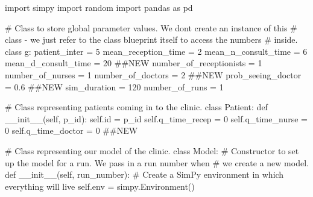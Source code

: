 \documentclass[
  letterpaper,
  DIV=11,
  numbers=noendperiod]{scrreprt}
\newenvironment{Shaded}{}{}
\newcommand{\BuiltInTok}[1]{\textcolor[rgb]{0.84,0.23,0.29}{#1}}
\newcommand{\CommentTok}[1]{\textcolor[rgb]{0.42,0.45,0.49}{#1}}
\newcommand{\DecValTok}[1]{\textcolor[rgb]{0.00,0.36,0.77}{#1}}
\newcommand{\FloatTok}[1]{\textcolor[rgb]{0.00,0.36,0.77}{#1}}
\newcommand{\FunctionTok}[1]{\textcolor[rgb]{0.44,0.26,0.76}{#1}}
\newcommand{\ImportTok}[1]{\textcolor[rgb]{0.01,0.18,0.38}{#1}}
\newcommand{\KeywordTok}[1]{\textcolor[rgb]{0.84,0.23,0.29}{#1}}
\newcommand{\NormalTok}[1]{\textcolor[rgb]{0.14,0.16,0.18}{#1}}
\newcommand{\OperatorTok}[1]{\textcolor[rgb]{0.14,0.16,0.18}{#1}}
\newcommand{\VariableTok}[1]{\textcolor[rgb]{0.89,0.38,0.04}{#1}}
\begin{document}
\begin{tcolorbox}[enhanced jigsaw, colframe=quarto-callout-note-color-frame, bottomtitle=1mm, breakable, rightrule=.15mm, coltitle=black, colbacktitle=quarto-callout-note-color!10!white, opacityback=0, leftrule=.75mm, arc=.35mm, toptitle=1mm, title=\textcolor{quarto-callout-note-color}{\faInfo}\hspace{0.5em}{Click here to view the code}, titlerule=0mm, colback=white, toprule=.15mm, bottomrule=.15mm, left=2mm, opacitybacktitle=0.6]

\begin{Shaded}
\begin{Highlighting}[]
\ImportTok{import}\NormalTok{ simpy}
\ImportTok{import}\NormalTok{ random}
\ImportTok{import}\NormalTok{ pandas }\ImportTok{as}\NormalTok{ pd}

\CommentTok{\# Class to store global parameter values.  We don\textquotesingle{}t create an instance of this}
\CommentTok{\# class {-} we just refer to the class blueprint itself to access the numbers}
\CommentTok{\# inside.}
\KeywordTok{class}\NormalTok{ g:}
\NormalTok{    patient\_inter }\OperatorTok{=} \DecValTok{5}
\NormalTok{    mean\_reception\_time }\OperatorTok{=} \DecValTok{2}
\NormalTok{    mean\_n\_consult\_time }\OperatorTok{=} \DecValTok{6}
\NormalTok{    mean\_d\_consult\_time }\OperatorTok{=} \DecValTok{20} \CommentTok{\#\#NEW}
\NormalTok{    number\_of\_receptionists }\OperatorTok{=} \DecValTok{1}
\NormalTok{    number\_of\_nurses }\OperatorTok{=} \DecValTok{1}
\NormalTok{    number\_of\_doctors }\OperatorTok{=} \DecValTok{2} \CommentTok{\#\#NEW}
\NormalTok{    prob\_seeing\_doctor }\OperatorTok{=} \FloatTok{0.6} \CommentTok{\#\#NEW}
\NormalTok{    sim\_duration }\OperatorTok{=} \DecValTok{120}
\NormalTok{    number\_of\_runs }\OperatorTok{=} \DecValTok{1}

\CommentTok{\# Class representing patients coming in to the clinic.}
\KeywordTok{class}\NormalTok{ Patient:}
    \KeywordTok{def} \FunctionTok{\_\_init\_\_}\NormalTok{(}\VariableTok{self}\NormalTok{, p\_id):}
        \VariableTok{self}\NormalTok{.}\BuiltInTok{id} \OperatorTok{=}\NormalTok{ p\_id}
        \VariableTok{self}\NormalTok{.q\_time\_recep }\OperatorTok{=} \DecValTok{0}
        \VariableTok{self}\NormalTok{.q\_time\_nurse }\OperatorTok{=} \DecValTok{0}
        \VariableTok{self}\NormalTok{.q\_time\_doctor }\OperatorTok{=} \DecValTok{0} \CommentTok{\#\#NEW}

\CommentTok{\# Class representing our model of the clinic.}
\KeywordTok{class}\NormalTok{ Model:}
    \CommentTok{\# Constructor to set up the model for a run.  We pass in a run number when}
    \CommentTok{\# we create a new model.}
    \KeywordTok{def} \FunctionTok{\_\_init\_\_}\NormalTok{(}\VariableTok{self}\NormalTok{, run\_number):}
        \CommentTok{\# Create a SimPy environment in which everything will live}
        \VariableTok{self}\NormalTok{.env }\OperatorTok{=}\NormalTok{ simpy.Environment()}


\end{Highlighting}
\end{Shaded}
\end{tcolorbox}
\end{document}
